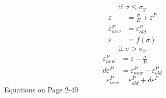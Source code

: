 \documentclass[12pt]{article}
\begin{document}
\begin{equation}
\text{if } \sigma \leq \sigma_y
\end{equation}
\begin{align}
\varepsilon &=\frac{\sigma}{E}+\varepsilon^{P} \\
\varepsilon_{new}^{P} &=\varepsilon_{old}^{P} \\
\varepsilon &= f(\sigma)
\end{align}
\begin{equation}
\text{if } \sigma > \sigma_y
\end{equation}
\begin{align}
\varepsilon_{new}^{P} &=\varepsilon - \frac{\sigma}{E} \\
d \varepsilon^{P} &=\varepsilon_{new}^{P}- \varepsilon_{old}^{P}
\end{align}
\begin{equation}
\varepsilon_{new}^{P}=\varepsilon_{old}^{P}+d \varepsilon^{P}
\end{equation}
Equations on Page 2-49
\end{document}
